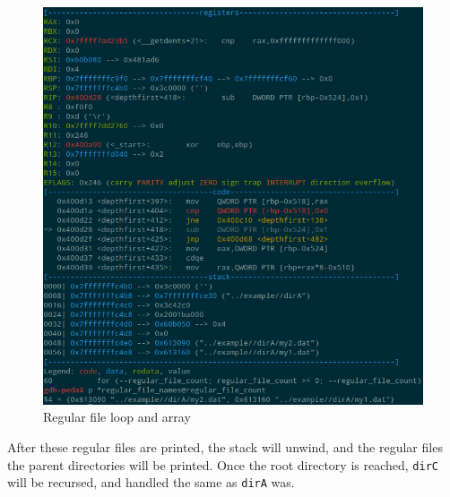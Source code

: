 \documentclass[a4paper,12pt,sffamily]{article}
\begin{document}
\begin{figure}[H]
	\centering
	\includegraphics[width=1\linewidth]{./images/11}
	\caption[regular_file_loop_array]{Regular file loop and array}
	\label{fig:12}
\end{figure}
After these regular files are printed, the stack will unwind, and the regular files the parent 
directories will be printed. Once the root directory is reached, \texttt{dirC} will be
recursed, and handled the same as \texttt{dirA} was.
\end{document}
